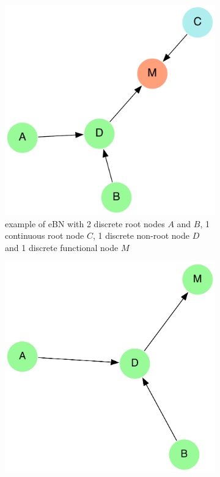 \begin{figure}[h]
    \centering
    \begin{subfigure}{0.45\textwidth}
        \centering
        \includegraphics[width=\linewidth]{imgs/pdfs/1_ebn.pdf}
        \caption{example of eBN with 2 discrete root nodes $A$ and $B$, 1 continuous root node $C$, 1 discrete non-root node $D$ and 1 discrete functional node $M$}\label{1_ebn_example}
    \end{subfigure}
    \hfill
    \begin{subfigure}{0.45\textwidth}
        \centering
        \includegraphics[width=\linewidth]{imgs/pdfs/2_rbn.pdf}

\end{subfigure}
\end{figure}
